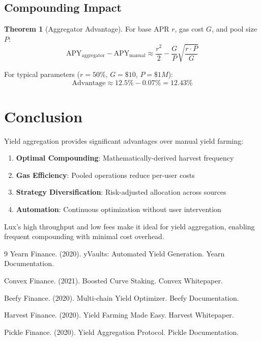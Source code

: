 \documentclass[11pt,a4paper]{article}
\theoremstyle{definition}
\newtheorem{theorem}{Theorem}
\begin{document}
\subsection{Compounding Impact}

\begin{theorem}[Aggregator Advantage]
For base APR $r$, gas cost $G$, and pool size $P$:
\begin{equation}
\text{APY}_{\text{aggregator}} - \text{APY}_{\text{manual}} \approx \frac{r^2}{2} - \frac{G}{P}\sqrt{\frac{r \cdot P}{G}}
\end{equation}
\end{theorem}

For typical parameters ($r = 50\%$, $G = \$10$, $P = \$1M$):
\begin{equation}
\text{Advantage} \approx 12.5\% - 0.07\% = 12.43\%
\end{equation}

\section{Conclusion}

Yield aggregation provides significant advantages over manual yield farming:

\begin{enumerate}
\item \textbf{Optimal Compounding}: Mathematically-derived harvest frequency
\item \textbf{Gas Efficiency}: Pooled operations reduce per-user costs
\item \textbf{Strategy Diversification}: Risk-adjusted allocation across sources
\item \textbf{Automation}: Continuous optimization without user intervention
\end{enumerate}

Lux's high throughput and low fees make it ideal for yield aggregation, enabling frequent compounding with minimal cost overhead.

\begin{thebibliography}{9}
Yearn Finance. (2020). yVaults: Automated Yield Generation. Yearn Documentation.

Convex Finance. (2021). Boosted Curve Staking. Convex Whitepaper.

Beefy Finance. (2020). Multi-chain Yield Optimizer. Beefy Documentation.

Harvest Finance. (2020). Yield Farming Made Easy. Harvest Whitepaper.

Pickle Finance. (2020). Yield Aggregation Protocol. Pickle Documentation.
\end{thebibliography}
\end{document}

